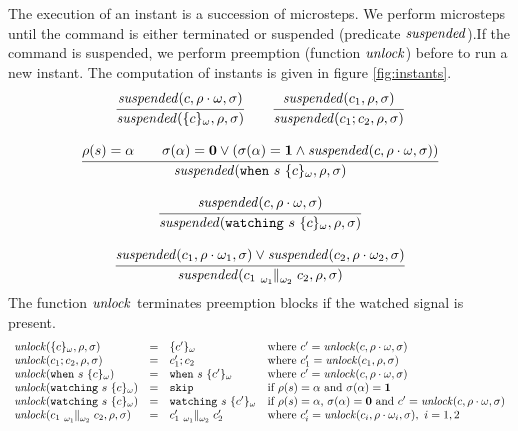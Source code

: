 \documentclass[12pt]{article}
\def\present{{\bf{1}}}
\def\absent{{\bf{0}}}
\newcommand{\parl}[2]{\tensor[_{#1}]{\parallel}{_{#2}}}
\def\env{\rho}
\def\heap{\sigma}
\newcommand{\when}[2]{{\tt{when}}~#1~#2}
\newcommand{\watching}[2]{{\tt{watching}}~#1~#2}
\def\skipp{{\tt{skip}}}
\begin{document}
The execution of an instant is a succession of microsteps. We perform microsteps until 
the command is either terminated or suspended (predicate $\suspended$).If the 
command is suspended, we perform preemption (function $\unlock$) before to run a new instant.
The computation of instants is given in figure \ref{fig:instants}.
$$
\begin{array}{c}
  \cfrac{
    \suspended(c,\env \cdot \omega,\heap)
  }{
   \suspended(\{c\}_\omega,\env,\heap)
  }
  \qquad
  \cfrac{
    \suspended(c_1,\env,\heap)
  }{
    \suspended(c_1;c_2,\env,\heap)
  }
  \\\\
  \cfrac{
    \env(s)=\alpha \qquad 
    \heap(\alpha)=\absent \vee (\heap(\alpha)=\present \wedge
    {\mathit{suspended}}(c,\env \cdot \omega,\heap))
  }
  {{\mathit{suspended}}(\when{s}{\{c\}_\omega},\env,\heap)}
  \\\\
  \cfrac{
    \suspended(c,\env\cdot \omega,\heap)
  }{
    \suspended(\watching{s}{\{c\}_\omega},\env,\heap)
  }
  \\\\
  \cfrac{
    \suspended(c_1,\env \cdot \omega_1,\heap) \vee 
      \suspended(c_2,\env \cdot \omega_2,\heap) 
  }{
    \suspended({c_1} \parl{\omega_1}{\omega_2} {c_2}, \env, \heap)
  }
\end{array}
$$
The function $\unlock$ terminates preemption blocks if the watched signal is present.
$$
\begin{array}{lcll}
  \unlock(\{c\}_\omega, \env,\sigma) &=& \{c'\}_\omega & {\text{where }} c'=\unlock(c,\env\cdot\omega,\heap)\\
  \unlock(c_1;c_2, \env,\sigma) &=& c_1';c_2 & {\text{where }} c_1'=\unlock(c_1,\env,\heap)\\
  \unlock(\when{s}{\{c\}_\omega}) &=& \when{s}{\{c'\}_\omega} & {\text{where }} c'=\unlock(c,\env\cdot\omega,\heap)\\
  \unlock(\watching{s}{\{c\}_\omega}) &=& \skipp & {\text{if $\rho(s)=\alpha$ and $\sigma(\alpha)=\present$}}\\
  \unlock(\watching{s}{\{c\}_\omega}) &=& \watching{s}{\{c'\}_\omega} & {\text{if $\rho(s)=\alpha$, $\sigma(\alpha)=\absent$ and $c'=\unlock(c,\env\cdot\omega,\heap)$}}\\
  \unlock(c_1 \parl{\omega_1}{\omega_2} c_2, \env, \heap) &=&c_1'\parl{\omega_1}{\omega_2} c_2' & {\text{where }} c_i' = \unlock(c_i,\env\cdot\omega_i,\heap),~i=1,2
 
\end{array}
$$
\end{document}

